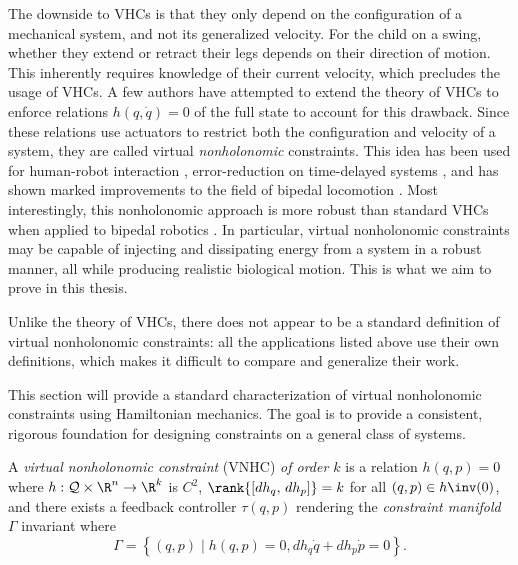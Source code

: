 The downside to VHCs is that they only depend on the configuration of a
mechanical system, and not its generalized velocity.
For the child on a swing, whether they extend or retract their legs
depends on their direction of motion. 
This inherently requires knowledge of their current velocity, which precludes
the usage of VHCs. 
A few authors have attempted to extend the theory of VHCs to enforce relations
\(h(q,\dot{q}) = 0\) of the full state to account for this drawback. 
Since these relations use actuators to restrict both the configuration and
velocity of a system, they are called virtual \textit{nonholonomic} constraints.
This idea has been used for human-robot interaction
\cite{vnhc_human_robot_cooperation,psd_based_vnhc_redundant_manipulator,haptic_vnhc},
error-reduction on time-delayed systems \cite{vnhc_time_delay_teleop},
and has shown marked improvements to the field of bipedal locomotion 
\cite{nhvc_dynamic_walking,
hybrid_zero_dynamics_bipedal_nhvcs,output_nhvc_bipedal_control}.
Most interestingly, this nonholonomic approach is more robust
than standard VHCs when applied to bipedal robotics \cite{nhvc_incline_walking}.
In particular, virtual nonholonomic constraints may be capable of injecting and
dissipating energy from a system in a robust manner, all while producing
realistic biological motion. This is what we aim to prove in this thesis.

Unlike the theory of VHCs, there does not appear to be a standard definition of
virtual nonholonomic constraints: 
all the applications listed above use their own definitions, which makes it
difficult to compare and generalize their work. 

This section will provide a standard characterization of virtual nonholonomic
constraints using Hamiltonian mechanics. 
The goal is to provide a consistent, rigorous foundation for designing
constraints on a general class of systems.

\begin{defn}
    A \textit{virtual nonholonomic constraint} (VNHC) \textit{of order \(k\)} is a
    relation \(h(q,p) = 0\) where \(h : \mathcal{Q}\times\R^n \rightarrow \R^k\) is
    \(C^2\), \(\rank{\left[ dh_q,\, dh_p \right]} = k\) for all 
    \((q,p) \in h\inv(0)\), and there exists a feedback controller \(\tau(q,p)\)
    rendering the \textit{constraint manifold} \(\Gamma\) invariant
    where
    \[
        \Gamma = \left\{(q,p) \mid h(q,p) = 0, dh_q \dot{q} + dh_p \dot{p} = 0\right\}
        .
    \]
\end{defn}

